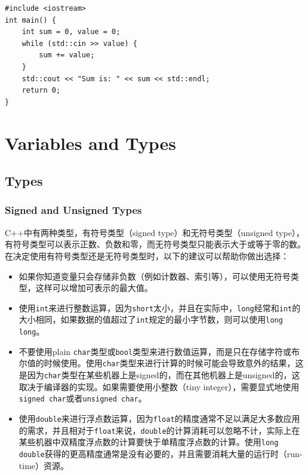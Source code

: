 \begin{verbatim}
#include <iostream>
int main() {
    int sum = 0, value = 0;
    while (std::cin >> value) {
        sum += value;
    }
    std::cout << "Sum is: " << sum << std::endl;
    return 0;
}
\end{verbatim}

\chapter{Variables and Types}
\section{Types}
\subsection{Signed and Unsigned Types}
C++中有两种类型，有符号类型（signed type）和无符号类型（unsigned type），有符号类型可以表示正数、负数和零，而无符号类型只能表示大于或等于零的数。在决定使用有符号类型还是无符号类型时，以下的建议可以帮助你做出选择：

\begin{itemize}
    \item 如果你知道变量只会存储非负数（例如计数器、索引等），可以使用无符号类型，这样可以增加可表示的最大值。
    \item 使用\texttt{int}来进行整数运算，因为\texttt{short}太小，并且在实际中，\texttt{long}经常和\texttt{int}的大小相同，如果数据的值超过了\texttt{int}规定的最小字节数，则可以使用\texttt{long long}。
    \item 不要使用plain \texttt{char}类型或\texttt{bool}类型来进行数值运算，而是只在存储字符或布尔值的时候使用。使用\texttt{char}类型来进行计算的时候可能会导致意外的结果，这是因为\texttt{char}类型在某些机器上是signed的，而在其他机器上是unsigned的，这取决于编译器的实现。如果需要使用小整数（tiny integer），需要显式地使用\texttt{signed char}或者\texttt{unsigned char}。
    \item 使用\texttt{double}来进行浮点数运算，因为\texttt{float}的精度通常不足以满足大多数应用的需求，并且相对于\texttt{float}来说，\texttt{double}的计算消耗可以忽略不计，实际上在某些机器中双精度浮点数的计算要快于单精度浮点数的计算。使用\texttt{long double}获得的更高精度通常是没有必要的，并且需要消耗大量的运行时（run-time）资源。
\end{itemize}

